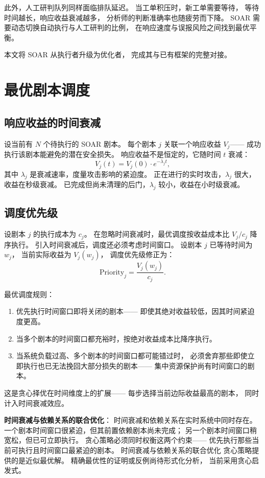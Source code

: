 \documentclass[11pt,a4paper]{article}
\begin{document}
此外，人工研判队列同样面临排队延迟。
当工单积压时，新工单需要等待，
等待时间越长，响应收益衰减越多，
分析师的判断准确率也随疲劳而下降。
SOAR 需要动态切换自动执行与人工研判的比例，
在响应速度与误报风险之间找到最优平衡。

本文将 SOAR 从执行者升级为优化者，
完成其与已有框架的完整对接。

\section{最优剧本调度}

\subsection{响应收益的时间衰减}

设当前有 \(N\) 个待执行的 SOAR 剧本。
每个剧本 \(j\) 关联一个响应收益 \(V_j\)——
成功执行该剧本能避免的潜在安全损失。
响应收益不是恒定的，它随时间 \(t\) 衰减：
\[
V_j(t) = V_j(0) \cdot e^{-\lambda_j t},
\]
其中 \(\lambda_j\) 是衰减速率，度量攻击影响的紧迫度。
正在进行的实时攻击，\(\lambda_j\) 很大，收益在秒级衰减。
已完成但尚未清理的后门，\(\lambda_j\) 较小，收益在小时级衰减。

\subsection{调度优先级}

设剧本 \(j\) 的执行成本为 \(c_j\)。
在忽略时间衰减时，最优调度按收益成本比 \(V_j / c_j\) 降序执行。
引入时间衰减后，调度还必须考虑时间窗口。
设剧本 \(j\) 已等待时间为 \(w_j\)，
当前实际收益为 \(V_j(w_j)\)，
调度优先级修正为：
\[
\text{Priority}_j = \frac{V_j(w_j)}{c_j}.
\]

最优调度规则：
\begin{enumerate}[label=(\arabic*)]
    \item 优先执行时间窗口即将关闭的剧本——
          即使其绝对收益较低，因其时间紧迫度更高。
    \item 当多个剧本的时间窗口都充裕时，按绝对收益成本比降序执行。
    \item 当系统负载过高、多个剧本的时间窗口都可能错过时，
          必须舍弃那些即使立即执行也已无法挽回大部分损失的剧本——
          集中资源保护尚有时间窗口的剧本。
\end{enumerate}

这是贪心择优在时间维度上的扩展——
每步选择当前边际收益最高的剧本，
同时计入时间衰减效应。

\textbf{时间衰减与依赖关系的联合优化}：
时间衰减和依赖关系在实时系统中同时存在。
一个剧本时间窗口很紧迫，但其前置依赖剧本尚未完成；
另一个剧本时间窗口稍宽松，但已可立即执行。
贪心策略必须同时权衡这两个约束——
优先执行那些当前可执行且时间窗口最紧迫的剧本。
时间衰减与依赖关系的联合优化
贪心策略提供的是近似最优解。
精确最优性的证明或反例尚待形式化分析，
当前采用贪心启发式。
\end{document}
